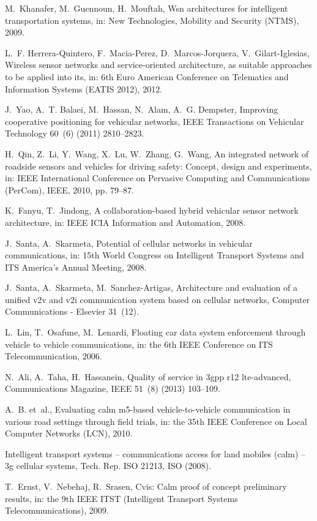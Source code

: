 \documentclass[10pt,onecolumn]{article}
\begin{document}
\begin{thebibliography}{00}
M.~Khanafer, M.~Guennoun, H.~Mouftah, Wsn architectures for intelligent
  transportation systems, in: New Technologies, Mobility and Security (NTMS),
  2009.

L.~F. Herrera-Quintero, F.~Macia-Perez, D.~Marcos-Jorquera, V.~Gilart-Iglesias,
  Wireless sensor networks and service-oriented architecture, as suitable
  approaches to be applied into its, in: 6th Euro American Conference on
  Telematics and Information Systems (EATIS 2012), 2012.

J.~Yao, A.~T. Balaei, M.~Hassan, N.~Alam, A.~G. Dempster, Improving cooperative
  positioning for vehicular networks, IEEE Transactions on Vehicular Technology
  60~(6) (2011) 2810--2823.

H.~Qin, Z.~Li, Y.~Wang, X.~Lu, W.~Zhang, G.~Wang, An integrated network of
  roadside sensors and vehicles for driving safety: Concept, design and
  experiments, in: IEEE International Conference on Pervasive Computing and
  Communications (PerCom), IEEE, 2010, pp. 79--87.

K.~Fanyu, T.~Jindong, A collaboration-based hybrid vehicular sensor network
  architecture, in: IEEE ICIA Information and Automation, 2008.

J.~Santa, A.~Skarmeta, Potential of cellular networks in vehicular
  communications, in: 15th World Congress on Intelligent Transport Systems and
  ITS America's Annual Meeting, 2008.

J.~Santa, A.~Skarmeta, M.~Sanchez-Artigas, Architecture and evaluation of a
  unified v2v and v2i communication system based on cellular networks, Computer
  Communications - Elsevier 31~(12).

L.~Lin, T.~Osafune, M.~Lenardi, Floating car data system enforcement through
  vehicle to vehicle communications, in: the 6th IEEE Conference on ITS
  Telecommunication, 2006.

N.~Ali, A.~Taha, H.~Hassanein, Quality of service in 3gpp r12 lte-advanced,
  Communications Magazine, IEEE 51~(8) (2013) 103--109.

A.~B. et~al., Evaluating calm m5-based vehicle-to-vehicle communication in
  various road settings through field trials, in: the 35th IEEE Conference on
  Local Computer Networks (LCN), 2010.

Intelligent transport systems -- communications access for land mobiles (calm)
  -- 3g cellular systems, Tech. Rep. ISO 21213, ISO (2008).

T.~Ernst, V.~Nebehaj, R.~Srasen, Cvis: Calm proof of concept preliminary
  results, in: the 9th IEEE ITST (Intelligent Transport Systems
  Telecommunications), 2009.

\end{thebibliography}
\end{document}
